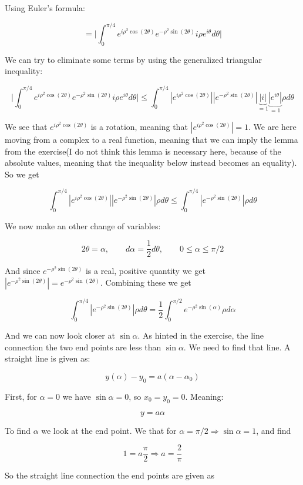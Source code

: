 \documentclass[a4paper,norsk, 10pt]{article}
\begin{document}
Using Euler's formula:

$$
= \big|\int_0^{\pi/4} e^{i\rho^2 \cos(2\theta)}e^{-\rho^2 \sin(2\theta)} i\rho e^{i\theta} d\theta \big|
$$

We can try to eliminate some terms by using the generalized triangular inequality:

$$
\big|\int_0^{\pi/4} e^{i\rho^2 \cos(2\theta)}e^{-\rho^2 \sin(2\theta)} i\rho e^{i\theta} d\theta \big| \leq \int_0^{\pi/4} |e^{i\rho^2 \cos(2\theta)}||e^{-\rho^2 \sin(2\theta)}|\underbrace{|i|}_{=1}\underbrace{|e^{i\theta}|}_{=1}\rho d\theta
$$

We see that $e^{i\rho^2 \cos(2\theta)}$ is a rotation, meaning that $|e^{i\rho^2 \cos(2\theta)}| = 1$. We are here moving from a complex to a real function, meaning that we can imply the lemma from the exercise(I do not think this lemma is necessary here, because of the absolute values, meaning that the inequality below instead becomes an equality). So we get

$$
\int_0^{\pi/4} |e^{i\rho^2 \cos(2\theta)}||e^{-\rho^2 \sin(2\theta)}|\rho d\theta \leq \int_0^{\pi/4} |e^{-\rho^2 \sin(2\theta)}|\rho d\theta
$$

We now make an other change of variables:

$$
2\theta = \alpha, \qquad d\alpha = \frac{1}{2} d\theta, \qquad 0 \leq \alpha \leq \pi/2
$$

And since $e^{-\rho^2 \sin(2\theta)}$ is a real, positive quantity we get $|e^{-\rho^2 \sin(2\theta)}| = e^{-\rho^2 \sin(2\theta)}$. Combining these we get 

$$
\int_0^{\pi/4} |e^{-\rho^2 \sin(2\theta)}|\rho d\theta = \frac{1}{2}\int_0^{\pi/2} e^{-\rho^2 \sin(\alpha)}\rho d\alpha
$$

And we can now look closer at $\sin \alpha$. As hinted in the exercise, the line connection the two end points are less than $\sin \alpha$. We need to find that line. A straight line is given as:

$$
y(\alpha) - y_0 = a(\alpha - \alpha_0)
$$

First, for $\alpha = 0$ we have $\sin \alpha = 0$, so $x_0 = y_0 = 0$. Meaning:

$$
y = a\alpha
$$

To find $\alpha$ we look at the end point. We that for $\alpha = \pi/2 \Rightarrow \sin\alpha = 1$, and find 

$$
1 = a\frac{\pi}{2} \Rightarrow a = \frac{2}{\pi}
$$ 

So the straight line connection the end points are given as
\end{document}
